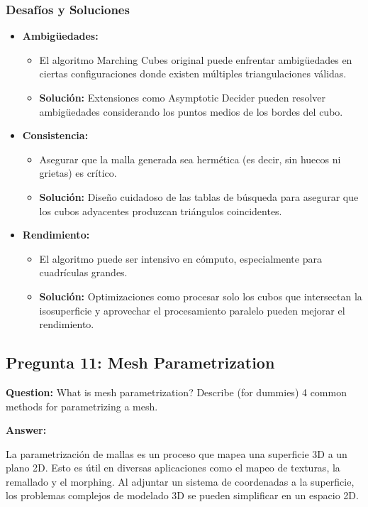 \documentclass{article}
\begin{document}
\subsubsection{Desafíos y Soluciones}

\begin{itemize}
    \item \textbf{Ambigüedades:}
    \begin{itemize}
        \item El algoritmo Marching Cubes original puede enfrentar ambigüedades en ciertas configuraciones donde existen múltiples triangulaciones válidas.
        \item \textbf{Solución:} Extensiones como Asymptotic Decider pueden resolver ambigüedades considerando los puntos medios de los bordes del cubo.
    \end{itemize}
    \item \textbf{Consistencia:}
    \begin{itemize}
        \item Asegurar que la malla generada sea hermética (es decir, sin huecos ni grietas) es crítico.
        \item \textbf{Solución:} Diseño cuidadoso de las tablas de búsqueda para asegurar que los cubos adyacentes produzcan triángulos coincidentes.
    \end{itemize}
    \item \textbf{Rendimiento:}
    \begin{itemize}
        \item El algoritmo puede ser intensivo en cómputo, especialmente para cuadrículas grandes.
        \item \textbf{Solución:} Optimizaciones como procesar solo los cubos que intersectan la isosuperficie y aprovechar el procesamiento paralelo pueden mejorar el rendimiento.
    \end{itemize}
\end{itemize}

\subsection{Pregunta 11: Mesh Parametrization}

\textbf{Question:} What is mesh parametrization? Describe (for dummies) 4 common methods for parametrizing a mesh.

\textbf{Answer:}

La parametrización de mallas es un proceso que mapea una superficie 3D a un plano 2D. Esto es útil en diversas aplicaciones como el mapeo de texturas, la remallado y el morphing. Al adjuntar un sistema de coordenadas a la superficie, los problemas complejos de modelado 3D se pueden simplificar en un espacio 2D.
\end{document}
